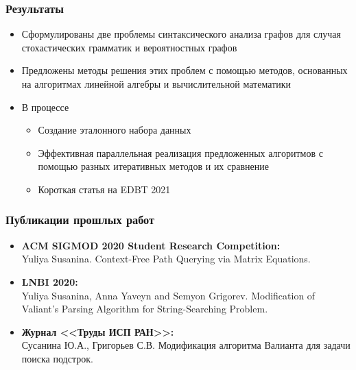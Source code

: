 \documentclass[xcolor=table]{beamer}
\begin{document}
\begin{frame}[fragile]
  \transwipe[direction=90]
  \frametitle{Результаты}
  
\begin{itemize}
    \item Сформулированы две проблемы синтаксического анализа графов для случая стохастических грамматик и вероятностных графов
    \item Предложены методы решения этих проблем с помощью методов, основанных на алгоритмах линейной алгебры и вычислительной математики
    \item В процессе
    \begin{itemize}
    \item Создание эталонного набора данных
    \item Эффективная параллельная реализация предложенных алгоритмов с помощью разных итеративных методов и их сравнение
    \item Короткая статья на EDBT 2021
\end{itemize}
\end{itemize}
\end{frame}


\begin{frame}[fragile]
  \transwipe[direction=90]
  \frametitle{Публикации прошлых работ}
  
\begin{itemize}

  \item \textbf{ACM SIGMOD 2020 Student Research Competition:} \\ 
  Yuliya Susanina. Context-Free Path Querying via Matrix Equations.\\
  \item \textbf{LNBI 2020:} \\
  Yuliya Susanina, Anna Yaveyn and Semyon Grigorev. Modification of Valiant’s Parsing Algorithm for String-Searching Problem. \\
  \item \textbf{Журнал <<Труды ИСП РАН>>:} \\
  Сусанина Ю.А., Григорьев С.В. Модификация алгоритма Валианта для задачи поиска подстрок. \\
  
\end{itemize}

\end{frame}
\end{document}

